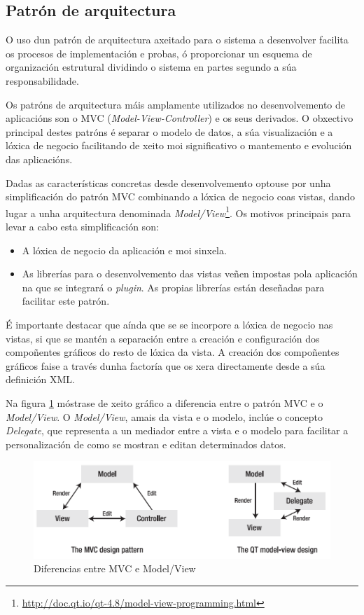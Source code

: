 \subsection{Patrón de arquitectura}
O uso dun patrón de arquitectura axeitado para o sistema a desenvolver facilita os procesos de implementación e probas, ó proporcionar un esquema de organización estrutural dividindo o sistema en partes segundo a súa responsabilidade.

Os patróns de arquitectura máis amplamente utilizados no desenvolvemento de aplicacións son o MVC (\emph{Model-View-Controller}) e os seus derivados. O obxectivo principal destes patróns é separar o modelo de datos, a súa visualización e a lóxica de negocio facilitando de xeito moi significativo o mantemento e evolución das aplicacións.

Dadas as características concretas desde desenvolvemento optouse por unha simplificación do patrón MVC combinando a lóxica de negocio coas vistas, dando lugar a unha arquitectura denominada \emph{Model/View}\footnote{\url{http://doc.qt.io/qt-4.8/model-view-programming.html}}. Os motivos principais para levar a cabo esta simplificación son:
\begin{itemize}
\item A lóxica de negocio da aplicación e moi sinxela.
\item As librerías para o desenvolvemento das vistas veñen impostas pola aplicación na que se integrará o \emph{plugin}. As propias librerías están deseñadas para facilitar este patrón.
\end{itemize}

É importante destacar que aínda que se se incorpore a lóxica de negocio nas vistas, si que se mantén a separación entre a creación e configuración dos compoñentes gráficos do resto de lóxica da vista. A creación dos compoñentes gráficos faise a través dunha factoría que os xera directamente desde a súa definición XML.

Na figura \ref{fig:MVCvsMV} móstrase de xeito gráfico a diferencia entre o patrón MVC e o \emph{Model/View}. O \emph{Model/View}, amais da vista e o modelo, inclúe o concepto \emph{Delegate}, que representa a un mediador entre a vista e o modelo para facilitar a personalización de como se mostran e editan determinados datos.

\begin{figure}[hbtp]
 \centering
 \includegraphics[width=\textwidth]{images/MVCvsMV.png}
 \caption{Diferencias entre MVC e Model/View}
 \label{fig:MVCvsMV}
\end{figure}

